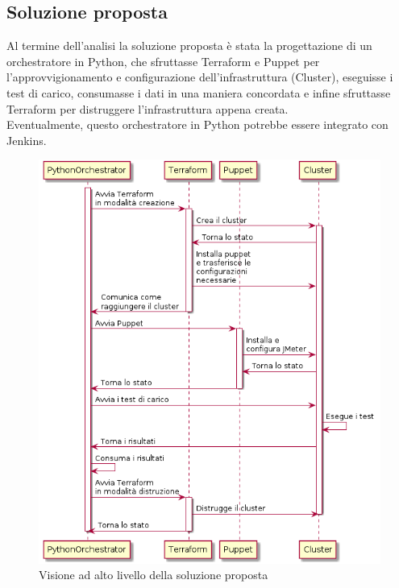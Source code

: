 \subsection{Soluzione proposta}
Al termine dell'analisi la soluzione proposta è stata la progettazione di un orchestratore in Python, che sfruttasse Terraform e Puppet per l'approvvigionamento e configurazione dell'infrastruttura (Cluster), eseguisse i test di carico, consumasse i dati in una maniera concordata e infine sfruttasse Terraform per distruggere l'infrastruttura appena creata. \\
Eventualmente, questo orchestratore in Python potrebbe essere integrato con Jenkins.
\begin{figure}[H]
	\centering
	\includegraphics[width=13cm]{immagini/soluzione}
	\caption{Visione ad alto livello della soluzione proposta}
	\label{img-soluzione}
\end{figure}
